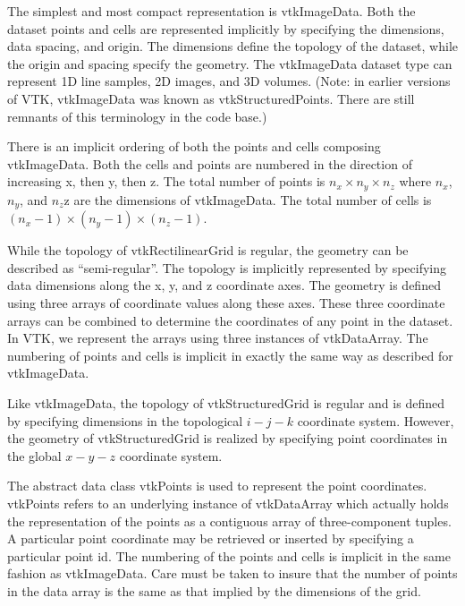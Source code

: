 \begin{description}[leftmargin=0cm,labelindent=0cm]

\item[vtkImageData.\index{image data!representation}] The simplest and most compact representation is vtkImageData. Both the dataset points and cells are represented implicitly by specifying the dimensions, data spacing, and origin. The dimensions define the topology of the dataset, while the origin and spacing specify the geometry. The vtkImageData dataset type can represent 1D line samples, 2D images, and 3D volumes. (Note: in earlier versions of VTK, vtkImageData was known as vtkStructuredPoints. There are still remnants of this terminology in the code base.)

There is an implicit ordering of both the points and cells composing vtkImageData. Both the cells and points are numbered in the direction of increasing x, then y, then z. The total number of points is $n_x \times n_y \times n_z$ where $n_x$, $n_y$, and $n_z$z are the dimensions of vtkImageData. The total number of cells is $(n_x - 1) \times  (n_y - 1) \times (n_z - 1)$.

\item[vtkRectilinearGrid.] While the topology of vtkRectilinearGrid is regular, the geometry can be described as ``semi-regular''. The topology is implicitly represented by specifying data dimensions along the x, y, and z coordinate axes. The geometry is defined using three arrays of coordinate values along these axes. These three coordinate arrays can be combined to determine the coordinates of any point in the dataset. In VTK, we represent the arrays using three instances of vtkDataArray. The numbering of points and cells is implicit in exactly the same way as described for vtkImageData.

\item[vtkStructuredGrid.] Like vtkImageData, the topology of vtkStructuredGrid is regular and is defined by specifying dimensions in the topological $i-j-k$ coordinate system. However, the geometry of vtkStructuredGrid is realized by specifying point coordinates in the global $x-y-z$ coordinate system.

The abstract data class vtkPoints is used to represent the point coordinates. vtkPoints refers to an underlying instance of vtkDataArray which actually holds the representation of the points as a contiguous array of three-component tuples. A particular point coordinate may be retrieved or inserted by specifying a particular point id. The numbering of the points and cells is implicit in the same fashion as vtkImageData. Care must be taken to insure that the number of points in the data array is the same as that implied by the dimensions of the grid.


\end{description}
